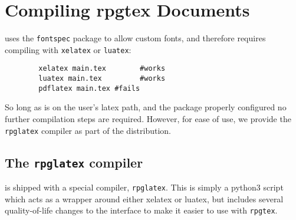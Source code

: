 \section{Compiling rpgtex Documents}\label{C:Compiler}


	\rpgtex{} uses the \texttt{fontspec} package to allow custom fonts, and therefore requires compiling with \texttt{xelatex} or \texttt{luatex}:

	\begin{lstlisting}
		xelatex main.tex		#works
		luatex main.tex			#works
		pdflatex main.tex #fails
	\end{lstlisting}
	So long as \rpgtex{} is on the user's latex path, and the package properly configured  no further compilation steps are required. However, for ease of use, we provide the \verb|rpglatex| compiler as part of the \rpgtex{} distribution.

	\subsection{The \texttt{rpglatex} compiler}

	\rpgtex{} is shipped with a special compiler, \verb|rpglatex|. This is simply a python3 script which acts as a wrapper around either xelatex or luatex, but includes several quality-of-life changes to the interface to make it easier to use with \verb|rpgtex|.

